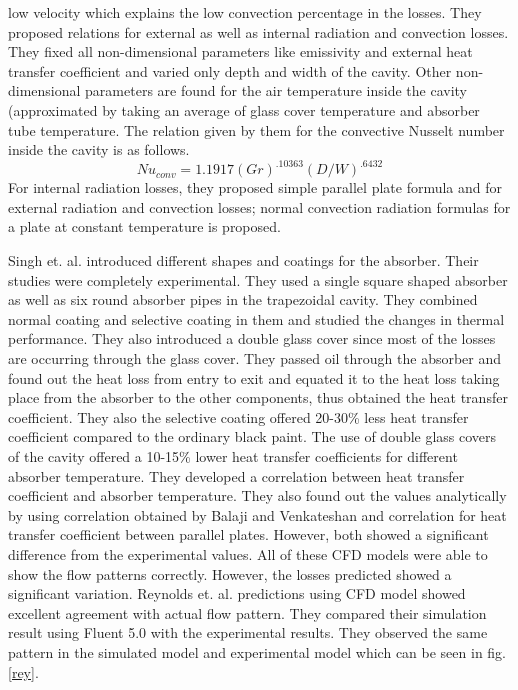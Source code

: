low velocity which explains the low convection percentage in the losses. They proposed relations for external as well as internal radiation and convection losses. They fixed all non-dimensional parameters like emissivity and external heat transfer coefficient and varied only depth and width of the cavity. Other non-dimensional parameters are found for the air temperature inside the cavity (approximated by taking an average of glass cover temperature and
absorber tube temperature. The relation given by them for the convective Nusselt number inside the cavity is as follows.
\begin{equation}
Nu_{conv} = 1.1917(Gr)^{.10363}(D/W)^{.6432}
\end{equation}
For internal radiation losses, they proposed simple parallel plate formula and for external
radiation and convection losses; normal convection radiation formulas for a plate at constant
temperature is proposed.

Singh et. al.\citep{SINGH2010329} introduced different shapes and coatings for the absorber. Their studies were completely experimental. They used a single square shaped absorber as well as six round absorber pipes in the trapezoidal cavity. They combined normal coating and selective coating in them and studied the changes in thermal performance. They also introduced a double glass cover since most of the losses are occurring through the glass cover. They passed oil through the absorber and found out the heat loss from entry to exit and equated it to the heat loss taking place from the absorber to the other components, thus obtained the heat transfer coefficient. They also the selective coating offered 20-30\% less heat transfer coefficient compared to the ordinary black paint. The use of double glass covers of the cavity offered a 10-15\% lower heat transfer coefficients for different absorber temperature. They developed a correlation between heat transfer coefficient and absorber temperature. They also found out the values analytically by using correlation obtained by Balaji and Venkateshan\citep{BALAJI1994249} and correlation for heat transfer coefficient between parallel plates.
However, both showed a significant difference from the experimental values.
All of these CFD models were able to show the flow patterns correctly. However, the losses predicted showed a significant variation. Reynolds et. al.\citep{REYNOLDS2004229} predictions using CFD model showed excellent agreement with actual flow pattern. They compared their simulation result using Fluent 5.0 with the experimental results. They observed the same pattern in the simulated model and experimental model which can be seen in fig.\ref{rey}. 

